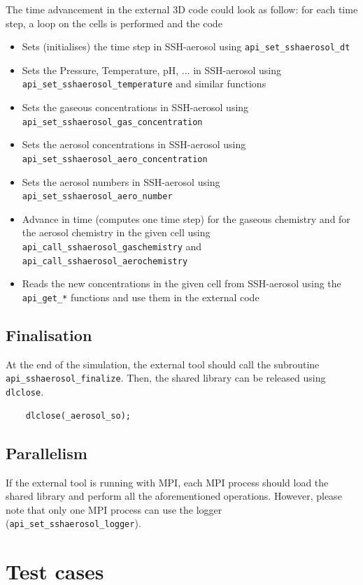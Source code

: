 \documentclass[a4paper,11pt]{article}
\begin{document}
The time advancement in the external 3D code could look as follow: for each time step, a loop on the cells is performed and the code
\begin{itemize}
\item Sets (initialises) the time step in SSH-aerosol using \texttt{api\_set\_sshaerosol\_dt}
\item Sets the Pressure, Temperature, pH, ... in SSH-aerosol using \texttt{api\_set\_sshaerosol\_temperature} and similar functions
\item Sets the gaseous concentrations in SSH-aerosol using \texttt{api\_set\_sshaerosol\_gas\_concentration}
\item Sets the aerosol concentrations in SSH-aerosol using \texttt{api\_set\_sshaerosol\_aero\_concentration}
\item Sets the aerosol numbers in SSH-aerosol using \texttt{api\_set\_sshaerosol\_aero\_number}
\item Advance in time (computes one time step) for the gaseous chemistry and for the aerosol chemistry in the given cell using \texttt{api\_call\_sshaerosol\_gaschemistry} and \\ \texttt{api\_call\_sshaerosol\_aerochemistry}
\item Reads the new concentrations in the given cell from SSH-aerosol using the \texttt{api\_get\_*} functions and use them in the external code
\end{itemize}

\subsection*{Finalisation}

At the end of the simulation, the external tool should call the subroutine \texttt{api\_sshaerosol\_finalize}.
Then, the shared library can  be released using \texttt{dlclose}.
\begin{verbatim}
    dlclose(_aerosol_so);
\end{verbatim}

\subsection*{Parallelism}
If the external tool is running with MPI, each MPI process should load the shared library and perform all the aforementioned operations.
However, please note that only one MPI process can use the logger (\texttt{api\_set\_sshaerosol\_logger}).

\section{Test cases}
\end{document}

